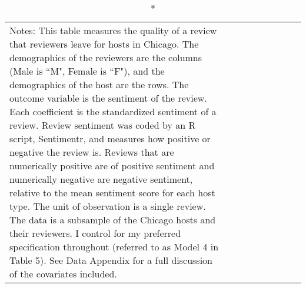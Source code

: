 \begin{landscape}
{\begin{longtable}{l*{8}{c}}
\caption*{Notes: This table measures the quality of a review that reviewers leave for hosts in Chicago. The demographics of the reviewers are the columns (Male is ``M", Female is ``F"), and the demographics of the host are the rows. The outcome variable is the sentiment of the review. Each coefficient is the standardized sentiment of a review. Review sentiment was coded by an R script, Sentimentr, and measures how positive or negative the review is. Reviews that are numerically positive are of positive sentiment and numerically negative are negative sentiment, relative to the mean sentiment score for each host type. The unit of observation is a single review. The data is a subsample of the Chicago hosts and their reviewers. I control for my preferred specification throughout (referred to as Model 4 in Table 5). See Data Appendix for a full discussion of the covariates included.}
\end{longtable}
}

\end{landscape}

\normalsize
